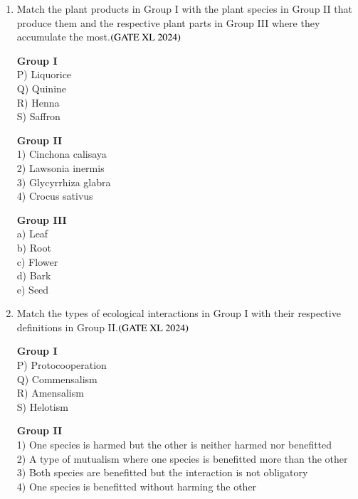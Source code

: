 \documentclass[journal]{IEEEtran}
\begin{document}
\begin{enumerate}
    \item Match the plant products in Group I with the plant species in Group II that produce them and the respective plant parts in Group III where they accumulate the most.\hfill $\left(\text{GATE XL 2024}\right)$
    \begin{multicols}{3}
    \noindent \textbf{Group I} \\
    P) Liquorice \\
    Q) Quinine \\
    R) Henna \\
    S) Saffron \\

    \columnbreak

    \noindent \textbf{Group II} \\
    1) Cinchona calisaya \\
    2) Lawsonia inermis \\
    3) Glycyrrhiza glabra \\
    4) Crocus sativus \\

    \columnbreak

    \noindent \textbf{Group III} \\
    a) Leaf \\
    b) Root \\
    c) Flower \\
    d) Bark \\
    e) Seed \\
    \end{multicols}

    \item Match the types of ecological interactions in Group I with their respective definitions in Group II.\hfill $\left(\text{GATE XL 2024}\right)$
    \begin{multicols}{2}
    \noindent \textbf{Group I} \\
    P) Protocooperation \\
    Q) Commensalism \\
    R) Amensalism \\
    S) Helotism \\

    \columnbreak

    \noindent \textbf{Group II} \\
    1) One species is harmed but the other is neither harmed nor benefitted \\
    2) A type of mutualism where one species is benefitted more than the other \\
    3) Both species are benefitted but the interaction is not obligatory \\
    4) One species is benefitted without harming the other \\
    \end{multicols}


\end{enumerate}
\end{document}
